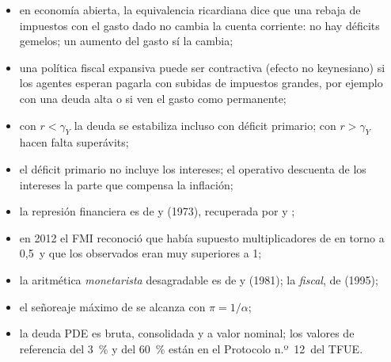 \documentclass[11pt]{article}
\begin{document}
\begin{itemize}
\begin{itemize}
  \item en economía abierta, la equivalencia ricardiana dice que una rebaja de impuestos con el gasto dado no cambia la cuenta corriente: no hay déficits gemelos; un aumento del gasto sí la cambia;
  \item una política fiscal expansiva puede ser contractiva (efecto no keynesiano) si los agentes esperan pagarla con subidas de impuestos grandes, por ejemplo con una deuda alta o si ven el gasto como permanente;
  \item con $r<\gamma_Y$ la deuda se estabiliza incluso con déficit primario; con $r>\gamma_Y$ hacen falta superávits;
  \item el déficit primario no incluye los intereses; el operativo descuenta de los intereses la parte que compensa la inflación;
  \item la represión financiera es de  y  (1973), recuperada por  y ;
  \item en 2012 el FMI reconoció que había supuesto multiplicadores de en torno a 0,5~y que los observados eran muy superiores a 1\nocite{BlanchardLeigh2013Growth};
  \item la aritmética \emph{monetarista} desagradable es de  y  (1981); la \emph{fiscal}, de  (1995);
  \item el señoreaje máximo de  se alcanza con $\pi=1/\alpha$;
  \item la deuda PDE es bruta, consolidada y a valor nominal; los valores de referencia del 3~\% y del 60~\% están en el Protocolo n.º~12~del TFUE.
  \end{itemize}
\end{itemize}

\bibliografia
\end{document}
